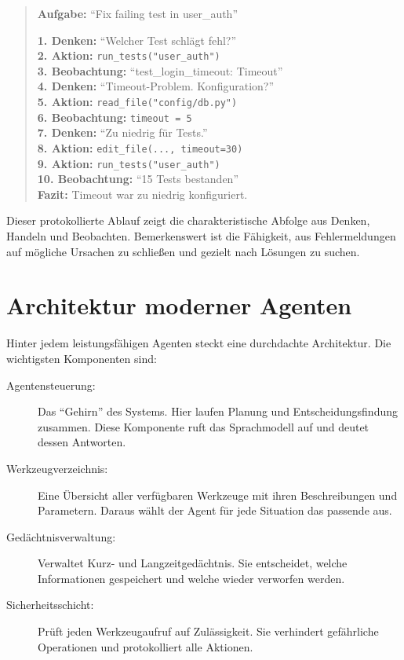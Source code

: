 \begin{quote}
\footnotesize
\textbf{Aufgabe:} \enquote{Fix failing test in user\_auth}

\textbf{1. Denken:} \enquote{Welcher Test schlägt fehl?}\\
\textbf{2. Aktion:} \texttt{run\_tests("user\_auth")}\\
\textbf{3. Beobachtung:} \enquote{test\_login\_timeout: Timeout}\\
\textbf{4. Denken:} \enquote{Timeout-Problem. Konfiguration?}\\
\textbf{5. Aktion:} \texttt{read\_file("config/db.py")}\\
\textbf{6. Beobachtung:} \texttt{timeout = 5}\\
\textbf{7. Denken:} \enquote{Zu niedrig für Tests.}\\
\textbf{8. Aktion:} \texttt{edit\_file(..., timeout=30)}\\
\textbf{9. Aktion:} \texttt{run\_tests("user\_auth")}\\
\textbf{10. Beobachtung:} \enquote{15 Tests bestanden}\\
\textbf{Fazit:} Timeout war zu niedrig konfiguriert.
\end{quote}

Dieser protokollierte Ablauf zeigt die charakteristische Abfolge aus Denken, Handeln und Beobachten. Bemerkenswert ist die Fähigkeit, aus Fehlermeldungen auf mögliche Ursachen zu schließen und gezielt nach Lösungen zu suchen.


\section{Architektur moderner Agenten}

Hinter jedem leistungsfähigen Agenten steckt eine durchdachte Architektur. Die wichtigsten Komponenten sind:

\begin{description}
  \item[Agentensteuerung:] Das \enquote{Gehirn} des Systems. Hier laufen Planung und Entscheidungsfindung zusammen. Diese Komponente ruft das Sprachmodell auf und deutet dessen Antworten.
  
  \item[Werkzeugverzeichnis:] Eine Übersicht aller verfügbaren Werkzeuge mit ihren Beschreibungen und Parametern. Daraus wählt der Agent für jede Situation das passende aus.
  
  \item[Gedächtnisverwaltung:] Verwaltet Kurz- und Langzeitgedächtnis. Sie entscheidet, welche Informationen gespeichert und welche wieder verworfen werden.
  
  \item[Sicherheitsschicht:] Prüft jeden Werkzeugaufruf auf Zulässigkeit. Sie verhindert gefährliche Operationen und protokolliert alle Aktionen.
\end{description}

